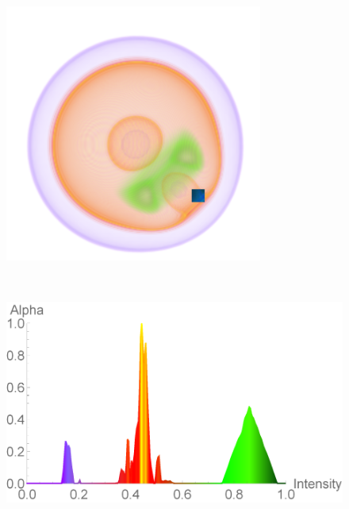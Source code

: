 \documentclass[twoside,twocolumn,10pt]{article}
\begin{document}
\begin{figure}
	\begin{minipage}{.1\textwidth}
		\centering
		\includegraphics[width=1\linewidth]{nucleon_yellow_crop}
		\label{fig:nucleon_2_yellow}
	\end{minipage}~
	\begin{minipage}{.13\textwidth}
		\centering
		\includegraphics[width=1\linewidth]{tf_nucleon_2_yellow}
		\label{fig:tf_nucleon_2_yellow}
	\end{minipage}

\end{figure}
\end{document}
